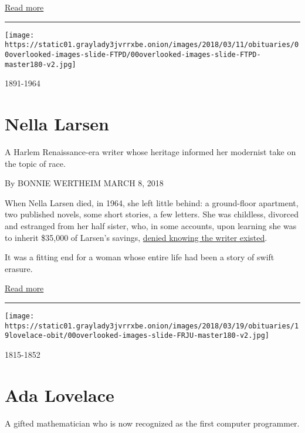 \href{https://www.nytimes3xbfgragh.onion/interactive/2018/obituaries/overlooked-emily-warren-roebling.html}{Read
more}

\begin{center}\rule{0.5\linewidth}{\linethickness}\end{center}

\texttt{[image: https://static01.graylady3jvrrxbe.onion/images/2018/03/11/obituaries/00overlooked-images-slide-FTPD/00overlooked-images-slide-FTPD-master180-v2.jpg]}

1891-1964

\hypertarget{nella-larsen}{%
\section{Nella Larsen}\label{nella-larsen}}

A Harlem Renaissance-era writer whose heritage informed her modernist
take on the topic of race.

By BONNIE WERTHEIM MARCH 8, 2018

When Nella Larsen died, in 1964, she left little behind: a ground-floor
apartment, two published novels, some short stories, a few letters. She
was childless, divorced and estranged from her half sister, who, in some
accounts, upon learning she was to inherit \$35,000 of Larsen's savings,
\href{https://books.google.com/books?id=yIdqlAFm_-cC\&pg=PA23\&lpg=PA23\&dq\#v=onepage\&q\&f=false}{denied
knowing the writer existed}.

It was a fitting end for a woman whose entire life had been a story of
swift erasure.

\href{https://www.nytimes3xbfgragh.onion/interactive/2018/obituaries/overlooked-nella-larsen.html}{Read
more}

\begin{center}\rule{0.5\linewidth}{\linethickness}\end{center}

\texttt{[image: https://static01.graylady3jvrrxbe.onion/images/2018/03/19/obituaries/19lovelace-obit/00overlooked-images-slide-FRJU-master180-v2.jpg]}

1815-1852

\hypertarget{ada-lovelace}{%
\section{Ada Lovelace}\label{ada-lovelace}}

A gifted mathematician who is now recognized as the first computer
programmer.

